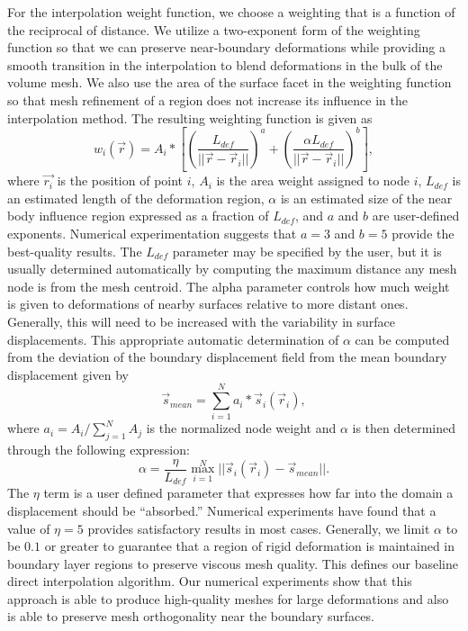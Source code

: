 For the interpolation weight function, we choose a weighting that is a
function of the reciprocal of distance.  We utilize a two-exponent
form of the weighting function so that we can preserve near-boundary
deformations while providing a smooth transition in the interpolation
to blend deformations in the bulk of the volume mesh.  We also use the
area of the surface facet in the weighting function so that mesh
refinement of a region does not increase its influence in the
interpolation method.  The resulting weighting function is given as
\begin{equation}
w_i(\vec{r}) = A_i * \left[
  \left(\frac{L_{def}}{||\vec{r}-\vec{r}_i||}\right)^a +
  \left(\frac{\alpha L_{def}}{||\vec{r}-\vec{r}_i||}\right)^b \right],
\label{eq:weight}
\end{equation}
where $\vec{r_i}$ is the position of point $i$, $A_i$ is the area
weight assigned to node $i$, $L_{def}$ is an estimated length of the
deformation region, $\alpha$ is an estimated size of the near body
influence region expressed as a fraction of $L_{def}$, and $a$ and $b$
are user-defined exponents.  Numerical experimentation suggests that
$a=3$ and $b=5$ provide the best-quality results.  The $L_{def}$
parameter may be specified by the user, but it is usually determined
automatically by computing the maximum distance any mesh node is from
the mesh centroid.  The alpha parameter controls how much weight is
given to deformations of nearby surfaces relative to more distant
ones.  Generally, this will need to be increased with the variability
in surface displacements.  This appropriate automatic determination of
$\alpha$ can be computed from the deviation of the boundary
displacement field from the mean boundary displacement given by
\begin{equation}
\vec{s}_{mean} = \sum_{i=1}^{N} a_i * \vec{s}_i(\vec{r}_i),
\end{equation}
where $a_i=A_i/\sum_{j=1}^N A_j$ is the normalized node weight and
 $\alpha$ is then determined through the following expression:
\begin{equation}
\alpha = \frac{\eta}{L_{def}}\max_{i=1}^N  ||\vec{s}_i(\vec{r}_i)-\vec{s}_{mean}||.
\label{eq:dynamicalpha}
\end{equation}
The $\eta$ term is a user defined parameter that expresses how far
into the domain a displacement should be ``absorbed.''  Numerical
experiments have found that a value of $\eta=5$ provides satisfactory
results in most cases.  Generally, we limit $\alpha$ to be $0.1$ or
greater to guarantee that a region of rigid deformation is maintained
in boundary layer regions to preserve viscous mesh quality.  This
defines our baseline direct interpolation algorithm.  Our numerical
experiments show that this approach is able to produce high-quality
meshes for large deformations and also is able to preserve mesh
orthogonality near the boundary surfaces.

